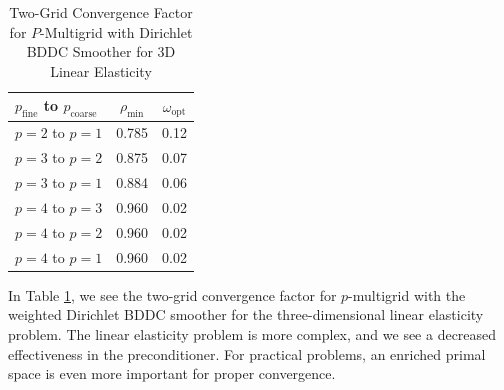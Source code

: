 \begin{table}[ht!]
\begin{center}
\begin{tabular}{l cc}
  \toprule
  $p_{\text{fine}}$ to $p_{\text{coarse}}$  & $\rho_{\min}$ & $\omega_{\text{opt}}$  \\
  \toprule
  $p = 2$ to $p = 1$   &  0.785 & 0.12  \\
  \midrule
  $p = 3$ to $p = 2$   &  0.875 & 0.07  \\
  $p = 3$ to $p = 1$   &  0.884 & 0.06  \\
  \midrule
  $p = 4$ to $p = 3$   &  0.960 & 0.02  \\
  $p = 4$ to $p = 2$   &  0.960 & 0.02  \\
  $p = 4$ to $p = 1$   &  0.960 & 0.02  \\
  \bottomrule
\end{tabular}
\end{center}
\caption{Two-Grid Convergence Factor for $P$-Multigrid with Dirichlet BDDC Smoother for 3D Linear Elasticity}
\label{table:two_grid_bddc_smoother_3d_lin_elas}
\end{table}

In Table \ref{table:two_grid_bddc_smoother_3d_lin_elas}, we see the two-grid convergence factor for $p$-multigrid with the weighted Dirichlet BDDC smoother for the three-dimensional linear elasticity problem.
The linear elasticity problem is more complex, and we see a decreased effectiveness in the preconditioner.
For practical problems, an enriched primal space is even more important for proper convergence.